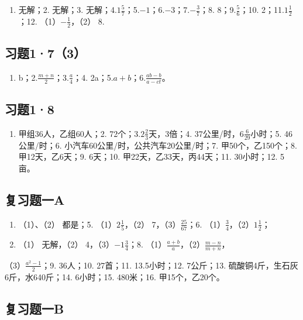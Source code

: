 \begin{enumerate}
\item
  无解；2. 无解；3.
  无解；4.\(1\frac{5}{7}\)；5.\(-1\)；6.\(-3\)；7.\(-\frac{3}{7}\)；8.
  8；9.\(\frac{5}{6}\)；10. 2；11.\(1\frac{1}{2}\)；12.
  （1）\(-\frac{1}{2}\)，（2） 8.
\end{enumerate}

\subsection{习题1·7（3）}

\begin{enumerate}
\item
  b；2.\(\frac{m+n}{2}\)；3.\(\frac{a}{4}\)；4.
  2a；5.\(a+b\)；6.\(\frac{ab-b}{a-ct}\)。
\end{enumerate}

\subsection{习题1·8}

\begin{enumerate}
\item
  甲组36人，乙组60人；2. 72个；3.\(2\frac{2}{3}\)天，3倍；4.
  37公里/时，\(6\frac{6}{29}\)小时；5. 46公里/时；6.
  小汽车60公里/时，公共汽车20公里/时；7. 甲50个，乙150个；8.
  甲12天，乙6天；9. 6天；10. 甲22天，乙33天，丙44天；11. 30小时；12.
  5亩。
\end{enumerate}

\subsection{复习题一A}

\begin{enumerate}[start=4]
\item
  （1）、（2） 都是；5. （1）\(2\frac{1}{5}\)，（2）
  7，（3）\(\frac{25}{67}\)；6.
  （1）\(\frac{3}{4}\)，（2）\(1\frac{1}{2}\)；
\item
  （1） 无解，（2） 4，（3）\(-1\frac{3}{4}\)；8.
  （1）\(\frac{a + b}{a}\)，（2）\(\frac{m - n}{m + n}\)，
\end{enumerate}

（3）\(\frac{a^2 - 1}{2}\)；9. 36人；10. 27首；11. 13.5小时；12.
7公斤；13. 硫酸铜4斤，生石灰6斤，水640斤；14. 6小时；15. 480米；16.
甲15个，乙20个。

\subsection{复习题一B}

